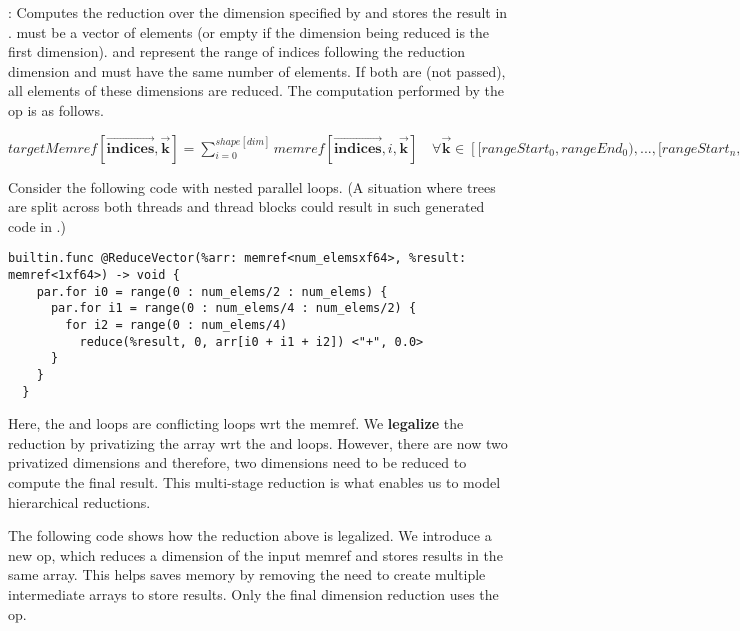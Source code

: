 \begin{definition}
  :
   Computes the reduction over the dimension specified by  and stores the 
   result in . \op{[indices]} must be a vector of  elements
   (or empty if the dimension being reduced is the first dimension). \op{[rangeStart]} 
   and \op{[rangeEnd]} represent the range of indices following the reduction dimension and 
   must have the same number of elements. If both are  (not passed), 
   all elements of these dimensions are reduced. The computation performed by the op is as follows.

  $targetMemref[\vec{\boldsymbol{indices}}, \vec{\boldsymbol{k}}] = \sum_{i=0}^{shape[dim]} memref[\vec{\boldsymbol{indices}}, i, \vec{\boldsymbol{k}}]\quad   \forall \vec{\boldsymbol{k}} \in \left[[rangeStart_0, rangeEnd_0), ... , [rangeStart_n, rangeEnd_n)\right]$
\end{definition}

Consider the following code with nested parallel loops. 
(A situation where trees are split across both
threads and thread blocks could result in such generated 
code in \Treebeard{}.)
\begin{lstlisting}[style=c++]
  builtin.func @ReduceVector(%arr: memref<num_elemsxf64>, %result: memref<1xf64>) -> void {
    par.for i0 = range(0 : num_elems/2 : num_elems) {
      par.for i1 = range(0 : num_elems/4 : num_elems/2) {
        for i2 = range(0 : num_elems/4) 
          reduce(%result, 0, arr[i0 + i1 + i2]) <"+", 0.0>
      }
    }
  }
\end{lstlisting}

Here, the  and  loops are conflicting loops wrt 
the  memref. We \textbf{legalize} the reduction 
by privatizing the  array wrt the  and  loops.
However, there are now two privatized dimensions and therefore, 
two dimensions need to be reduced to compute the final result.
This multi-stage reduction is what enables us to model 
hierarchical reductions.

The following code shows how the reduction above is legalized. 
We introduce a new op,  which 
reduces a dimension of the input memref and stores results 
in the same array. This helps saves memory by removing the 
need to create multiple intermediate arrays to store results.
Only the final dimension reduction uses the  op.

